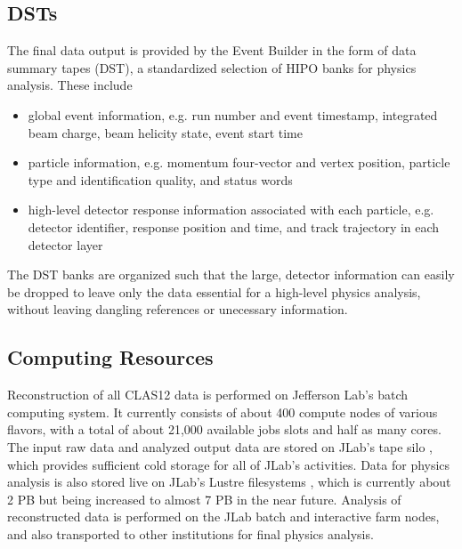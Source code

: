 \subsection{DSTs}\label{sec:dsts}
The final data output is provided by the Event Builder in the form of data summary tapes (DST), a standardized selection of HIPO banks for physics analysis.  These include
\begin{itemize}
    \item global event information, e.g. run number and event timestamp, integrated beam charge, beam helicity state, event start time
    \item particle information, e.g. momentum four-vector and vertex position, particle type and identification quality, and status words
    \item high-level detector response information associated with each particle, e.g. detector identifier, response position and time, and track trajectory in each detector layer
\end{itemize}
The DST banks are organized such that the large, detector information can easily be dropped to leave only the data essential for a high-level physics analysis, without leaving dangling references or unecessary information.

\subsection{Computing Resources}
Reconstruction of all CLAS12 data is performed on Jefferson Lab's batch computing system\cite{jlab-batch-farm}.  It currently consists of about 400 compute nodes of various flavors, with a total of about 21,000 available jobs slots and half as many cores.  The input raw data and analyzed output data are stored on JLab's tape silo \cite{jlab-tape-silo}, which provides sufficient cold storage for all of JLab's activities.  Data for physics analysis is also stored live on JLab's Lustre filesystems \cite{jlab-lustre}, which is currently about 2 PB but being increased to almost 7 PB in the near future.  Analysis of reconstructed data is performed on the JLab batch and interactive farm nodes, and also transported to other institutions for final physics analysis.
